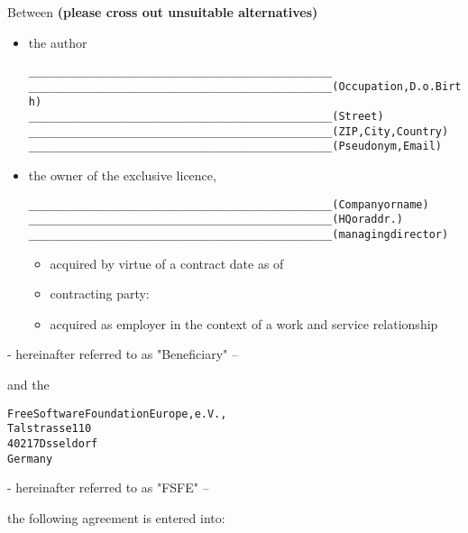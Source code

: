 Between 
{\bf (please cross out unsuitable alternatives)}\\
\begin{itemize}
\item the author
\begin{alltt}
    _______________________________________________
    _______________________________________________ (Occupation, D.o. Birth)
    _______________________________________________ (Street)
    _______________________________________________ (ZIP, City, Country)
    _______________________________________________ (Pseudonym, Email)
\end{alltt}
\item the owner of the exclusive licence,
\begin{alltt}
    _______________________________________________ (Company or name)
    _______________________________________________ (HQ or addr.)
    _______________________________________________ (managing director)
\end{alltt}
\begin{itemize}
\item acquired by virtue of a contract date as of
\item contracting party:
\item acquired as employer in the context of a work and service
  relationship
\end{itemize}
\end{itemize}
\begin{flushright}
- hereinafter referred to as "Beneficiary" --
\end{flushright}
and the
\begin{alltt}
    Free Software Foundation Europe, e.V.,
    Talstrasse 110
    40217 Dsseldorf
    Germany
\end{alltt}
\begin{flushright}
- hereinafter referred to as "FSFE" --
\end{flushright}
the following agreement is entered into:\\

